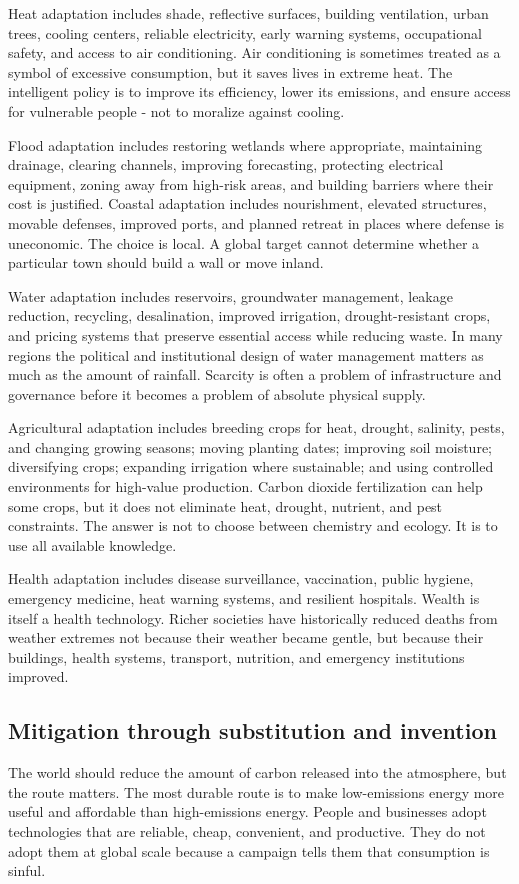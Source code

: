 ﻿\documentclass[12pt,a4paper]{book}
\begin{document}
Heat adaptation includes shade, reflective surfaces, building ventilation, urban trees, cooling centers, reliable electricity, early warning systems, occupational safety, and access to air conditioning. Air conditioning is sometimes treated as a symbol of excessive consumption, but it saves lives in extreme heat. The intelligent policy is to improve its efficiency, lower its emissions, and ensure access for vulnerable people - not to moralize against cooling.

Flood adaptation includes restoring wetlands where appropriate, maintaining drainage, clearing channels, improving forecasting, protecting electrical equipment, zoning away from high-risk areas, and building barriers where their cost is justified. Coastal adaptation includes nourishment, elevated structures, movable defenses, improved ports, and planned retreat in places where defense is uneconomic. The choice is local. A global target cannot determine whether a particular town should build a wall or move inland.

Water adaptation includes reservoirs, groundwater management, leakage reduction, recycling, desalination, improved irrigation, drought-resistant crops, and pricing systems that preserve essential access while reducing waste. In many regions the political and institutional design of water management matters as much as the amount of rainfall. Scarcity is often a problem of infrastructure and governance before it becomes a problem of absolute physical supply.

Agricultural adaptation includes breeding crops for heat, drought, salinity, pests, and changing growing seasons; moving planting dates; improving soil moisture; diversifying crops; expanding irrigation where sustainable; and using controlled environments for high-value production. Carbon dioxide fertilization can help some crops, but it does not eliminate heat, drought, nutrient, and pest constraints. The answer is not to choose between chemistry and ecology. It is to use all available knowledge.

Health adaptation includes disease surveillance, vaccination, public hygiene, emergency medicine, heat warning systems, and resilient hospitals. Wealth is itself a health technology. Richer societies have historically reduced deaths from weather extremes not because their weather became gentle, but because their buildings, health systems, transport, nutrition, and emergency institutions improved.

\subsection{Mitigation through substitution and invention}
The world should reduce the amount of carbon released into the atmosphere, but the route matters. The most durable route is to make low-emissions energy more useful and affordable than high-emissions energy. People and businesses adopt technologies that are reliable, cheap, convenient, and productive. They do not adopt them at global scale because a campaign tells them that consumption is sinful.
\end{document}
